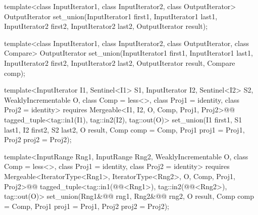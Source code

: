 %
\begin{removedblock}
\begin{itemdecl}
template<class InputIterator1, class InputIterator2,
         class OutputIterator>
  OutputIterator
    set_union(InputIterator1 first1, InputIterator1 last1,
              InputIterator2 first2, InputIterator2 last2,
              OutputIterator result);

template<class InputIterator1, class InputIterator2,
         class OutputIterator, class Compare>
  OutputIterator
    set_union(InputIterator1 first1, InputIterator1 last1,
              InputIterator2 first2, InputIterator2 last2,
              OutputIterator result, Compare comp);
\end{itemdecl}
\end{removedblock}
\begin{addedblock}
\begin{itemdecl}
template<InputIterator I1, Sentinel<I1> S1, InputIterator I2, Sentinel<I2> S2,
    WeaklyIncrementable O, class Comp = less<>, class Proj1 = identity, class Proj2 = identity>
  requires Mergeable<I1, I2, O, Comp, Proj1, Proj2>@\newtxt{()}@
  tagged_tuple<tag::in1(I1), tag::in2(I2), tag::out(O)>
    set_union(I1 first1, S1 last1, I2 first2, S2 last2, O result, Comp comp = Comp{},
              Proj1 proj1 = Proj1{}, Proj2 proj2 = Proj2{});

template<InputRange Rng1, InputRange Rng2, WeaklyIncrementable O,
    class Comp = less<>, class Proj1 = identity, class Proj2 = identity>
  requires Mergeable<IteratorType<Rng1>, IteratorType<Rng2>, O, Comp, Proj1, Proj2>@\newtxt{()}@
  tagged_tuple<tag::in1(@@<Rng1>),
               tag::in2(@@<Rng2>),
               tag::out(O)>
    set_union(Rng1&@\newtxt{\&}@ rng1, Rng2&@\newtxt{\&}@ rng2, O result, Comp comp = Comp{},
              Proj1 proj1 = Proj1{}, Proj2 proj2 = Proj2{});
\end{itemdecl}
\end{addedblock}

